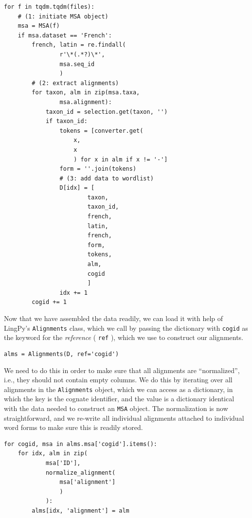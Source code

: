 \documentclass[
  a4paper,
  14pt,
  oneside,
  tablecaptionabove
]{scrbook}
\newcommand{\passthrough}[1]{#1}
\begin{document}
\begin{lstlisting}
for f in tqdm.tqdm(files):
    # (1: initiate MSA object)
    msa = MSA(f)
    if msa.dataset == 'French':
        french, latin = re.findall(
                r'\*(.*?)\*',
                msa.seq_id
                )
        # (2: extract alignments)
        for taxon, alm in zip(msa.taxa,
                msa.alignment):
            taxon_id = selection.get(taxon, '')
            if taxon_id:
                tokens = [converter.get(
                    x,
                    x
                    ) for x in alm if x != '-']
                form = ''.join(tokens)
                # (3: add data to wordlist)
                D[idx] = [
                        taxon,
                        taxon_id,
                        french,
                        latin,
                        french,
                        form,
                        tokens,
                        alm,
                        cogid
                        ]
                idx += 1
        cogid += 1
\end{lstlisting}

Now that we have assembled the data readily, we can load it with help of
LingPy's \passthrough{\lstinline!Alignments!} class, which we call by
passing the dictionary with \passthrough{\lstinline!cogid!} as the
keyword for the \emph{reference} ( \passthrough{\lstinline!ref!} ),
which we use to construct our alignments.

\begin{lstlisting}
alms = Alignments(D, ref='cogid')
\end{lstlisting}

We need to do this in order to make sure that all alignments are
\enquote{normalized}, i.e., they should not contain empty columns. We do
this by iterating over all alignments in the
\passthrough{\lstinline!Alignments!} object, which we can access as a
dictionary, in which the key is the cognate identifier, and the value is
a dictionary identical with the data needed to construct an
\passthrough{\lstinline!MSA!} object. The normalization is now
straightforward, and we re-write all individual alignments attached to
individual word forms to make sure this is readily stored.

\begin{lstlisting}
for cogid, msa in alms.msa['cogid'].items():
    for idx, alm in zip(
            msa['ID'],
            normalize_alignment(
                msa['alignment']
                )
            ):
        alms[idx, 'alignment'] = alm
\end{lstlisting}
\end{document}
